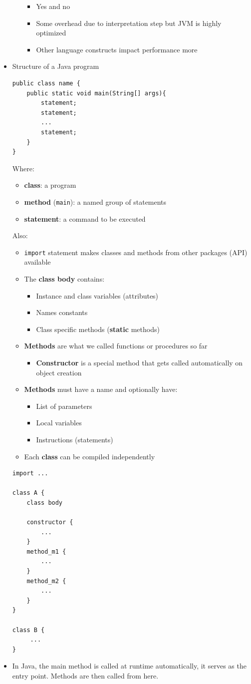 \documentclass[a4paper]{article}
\newcommand{\inline}[1]{\lstinline!#1!}%
\begin{document}
\begin{itemize}
\begin{itemize}
\begin{itemize}
\item Yes and no
\item Some overhead due to interpretation step but JVM is highly optimized
\item Other language constructs impact performance more
\end{itemize}
\end{itemize}
\item Structure of a Java program
\begin{lstlisting}
public class name {
	public static void main(String[] args){
		statement;
		statement;
		...
		statement;
	}
}
\end{lstlisting}
Where:
\begin{itemize}
\item \textbf{class}: a program
\item\textbf{method} (\inline{main}): a named group of statements
\item \textbf{statement}: a command to be executed
\end{itemize}
Also:
\begin{itemize}
\item \inline{import} statement makes classes and methods from other packages (API) available
\item The \textbf{class body} contains:
\begin{itemize}
\item Instance and class variables (attributes)
\item Names constants
\item Class specific methods (\textbf{static} methods)
\end{itemize}
\item \textbf{Methods} are what we called functions or procedures so far
\begin{itemize}
\item \textbf{Constructor} is a special method that gets called automatically on object creation
\end{itemize}
\item \textbf{Methods} must have a name and optionally have:
\begin{itemize}
\item List of parameters
\item Local variables
\item Instructions (statements)
\end{itemize}
\item Each \textbf{class} can be compiled independently 
\end{itemize}

\begin{lstlisting}
import ...

class A {
	class body
	
	constructor {
	    ...
	}
	method_m1 {
	    ...
	}
	method_m2 {
	    ...
	}
}	

class B {
     ...
}
\end{lstlisting}
\item In Java, the main method is called at runtime automatically, it serves as the entry point. Methods are then called from here.
\end{itemize}
\end{document}
